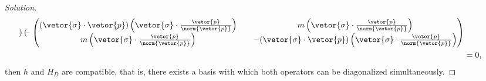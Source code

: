 \begin{proof}[Solution]
\begin{align*}
\begin{pmatrix}
         \end{pmatrix}-
         \begin{pmatrix}
            (\vetor{\sigma}\cdot \vetor{p})\left(\vetor{\sigma}\cdot\frac{\vetor{p}}{\norm{\vetor{p}}}\right) && m \left(\vetor{\sigma}\cdot\frac{\vetor{p}}{\norm{\vetor{p}}}\right)\\
            m \left(\vetor{\sigma}\cdot\frac{\vetor{p}}{\norm{\vetor{p}}}\right) && - (\vetor{\sigma} \cdot \vetor{p})\left(\vetor{\sigma}\cdot\frac{\vetor{p}}{\norm{\vetor{p}}}\right)
         \end{pmatrix}\\
                          &= 0
         ,
   \end{align*}
   then \(h\) and \(H_D\) are compatible, that is, there exists a basis with which both operators can be diagonalized simultaneously.


\end{proof}
